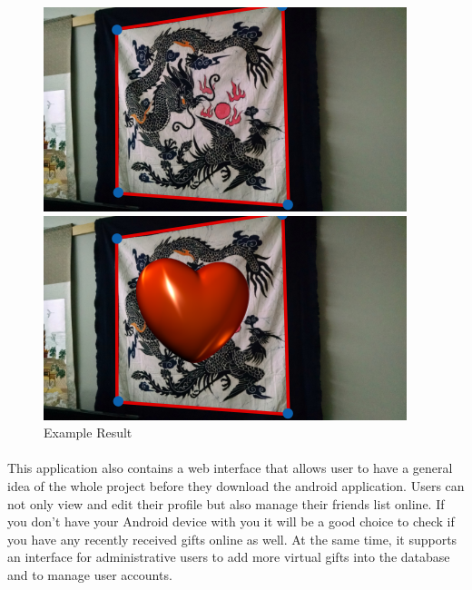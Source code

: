 \begin{figure}[H]
\centering
\begin{minipage}[t]{0.5\textwidth}
\includegraphics[width=.95\textwidth]{section01/assets/giftbox_1.png}
\end{minipage}%
\begin{minipage}[t]{0.5\textwidth}
\includegraphics[width=.95\textwidth]{section01/assets/giftbox_2.png}
\end{minipage}%
\caption[Sample Result 2]{Example Result}
\end{figure}

\paragraph{} This application also contains a web interface that allows user to have a general idea of the whole project before they download the android application. Users can not only view and edit their profile but also manage their friends list online. If you don't have your Android device with you it will be a good choice to check if you have any recently received gifts online as well. At the same time, it supports an interface for administrative users to add more virtual gifts into the database and to manage user accounts.